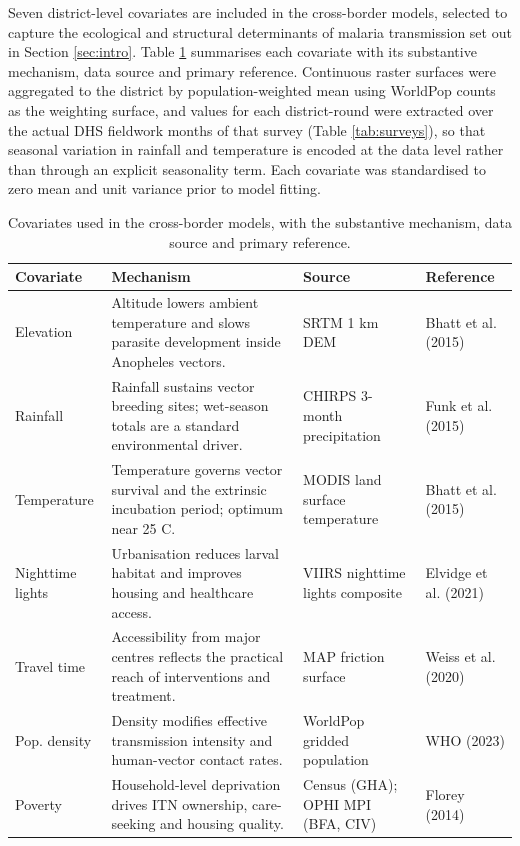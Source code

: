 \documentclass{article}
\begin{document}
\label{sec:covariates}

Seven district-level covariates are included in the cross-border models,
selected to capture the ecological and structural determinants of
malaria transmission set out in Section \ref{sec:intro}. Table
\ref{tab:covariates} summarises each covariate with its substantive
mechanism, data source and primary reference. Continuous raster surfaces
were aggregated to the district by population-weighted mean using
WorldPop counts as the weighting surface, and values for each
district-round were extracted over the actual DHS fieldwork months of
that survey (Table \ref{tab:surveys}), so that seasonal variation in
rainfall and temperature is encoded at the data level rather than
through an explicit seasonality term. Each covariate was standardised to
zero mean and unit variance prior to model fitting.

\begingroup\fontsize{9}{11}\selectfont

\begin{longtable}[t]{>{\raggedright\arraybackslash}p{2cm}>{\raggedright\arraybackslash}p{6cm}>{\raggedright\arraybackslash}p{4cm}>{\raggedright\arraybackslash}p{2.8cm}}
\caption{\label{tab:covariates}Covariates used in the cross-border models, with the substantive mechanism, data source and primary reference. \label{tab:covariates}}\\
\toprule
Covariate & Mechanism & Source & Reference\\
\midrule
Elevation & Altitude lowers ambient temperature and slows parasite development inside Anopheles vectors. & SRTM 1 km DEM & Bhatt et al. (2015)\\
Rainfall & Rainfall sustains vector breeding sites; wet-season totals are a standard environmental driver. & CHIRPS 3-month precipitation & Funk et al. (2015)\\
Temperature & Temperature governs vector survival and the extrinsic incubation period; optimum near 25 C. & MODIS land surface temperature & Bhatt et al. (2015)\\
Nighttime lights & Urbanisation reduces larval habitat and improves housing and healthcare access. & VIIRS nighttime lights composite & Elvidge et al. (2021)\\
Travel time & Accessibility from major centres reflects the practical reach of interventions and treatment. & MAP friction surface & Weiss et al. (2020)\\
\addlinespace
Pop. density & Density modifies effective transmission intensity and human-vector contact rates. & WorldPop gridded population & WHO (2023)\\
Poverty & Household-level deprivation drives ITN ownership, care-seeking and housing quality. & Census (GHA); OPHI MPI (BFA, CIV) & Florey (2014)\\
\bottomrule
\end{longtable}
\endgroup{}
\end{document}
